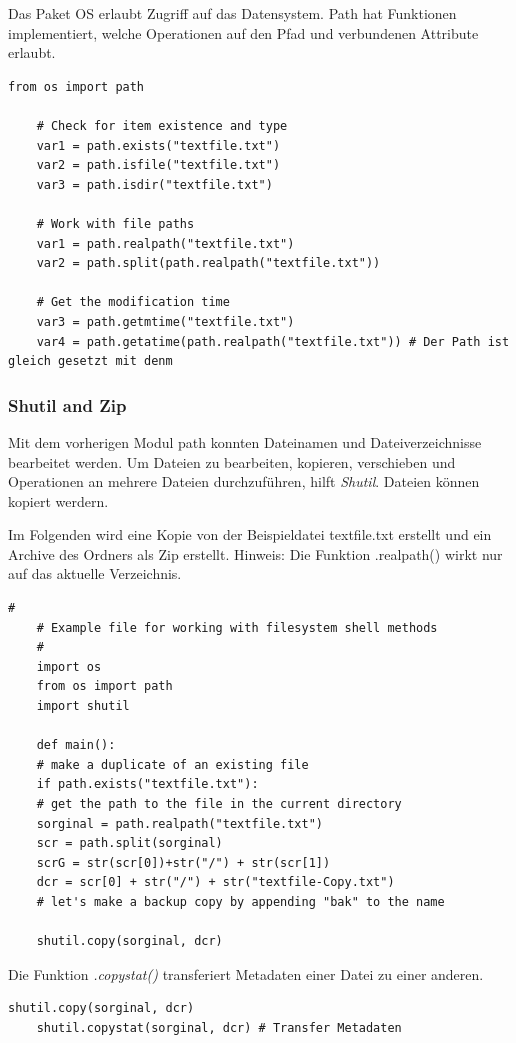 Das Paket OS erlaubt Zugriff auf das Datensystem. Path hat Funktionen implementiert, welche Operationen auf den Pfad und verbundenen Attribute erlaubt.

\begin{lstlisting}[style=python]
	from os import path
	
	# Check for item existence and type
	var1 = path.exists("textfile.txt")
	var2 = path.isfile("textfile.txt")
	var3 = path.isdir("textfile.txt")
	
	# Work with file paths
	var1 = path.realpath("textfile.txt")
	var2 = path.split(path.realpath("textfile.txt"))
	
	# Get the modification time
	var3 = path.getmtime("textfile.txt")
	var4 = path.getatime(path.realpath("textfile.txt")) # Der Path ist gleich gesetzt mit denm 
\end{lstlisting}

\subsubsection{Shutil and Zip}
Mit dem vorherigen Modul path konnten Dateinamen und Dateiverzeichnisse bearbeitet werden. Um Dateien zu bearbeiten, kopieren, verschieben und Operationen an mehrere Dateien durchzuführen, hilft \textit{Shutil}. Dateien können kopiert werdern.

Im Folgenden wird eine Kopie von der Beispieldatei textfile.txt erstellt und ein Archive des Ordners als Zip erstellt. Hinweis: Die Funktion .realpath() wirkt nur auf das aktuelle Verzeichnis. 

\begin{lstlisting}[style=python]
	#
	# Example file for working with filesystem shell methods
	#
	import os
	from os import path
	import shutil
	
	def main():
	# make a duplicate of an existing file
	if path.exists("textfile.txt"):
	# get the path to the file in the current directory
	sorginal = path.realpath("textfile.txt")
	scr = path.split(sorginal)
	scrG = str(scr[0])+str("/") + str(scr[1])
	dcr = scr[0] + str("/") + str("textfile-Copy.txt")
	# let's make a backup copy by appending "bak" to the name
	
	shutil.copy(sorginal, dcr)
\end{lstlisting}

Die Funktion \textit{.copystat()} transferiert Metadaten einer Datei zu einer anderen. 
\begin{lstlisting}[style=python]
	shutil.copy(sorginal, dcr)
	shutil.copystat(sorginal, dcr) # Transfer Metadaten
\end{lstlisting}

